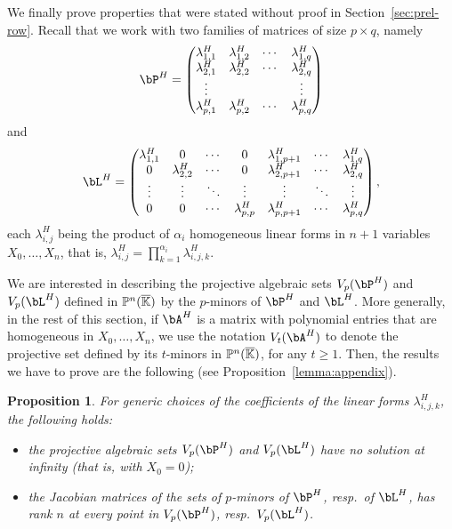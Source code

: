 \documentclass[12pt]{article}
\newtheorem*{propositionnonumber}{Proposition}
\begin{document}
We finally prove properties that were stated without proof in
Section~\ref{sec:prel-row}.  Recall that we work with two families of
matrices of size $p \times q$, namely
\begin{align}\label{eqdef:type2b}
\bP^H= \left( \begin{matrix}
\lambda^H_{1,1} & \lambda^H_{1,2} & \cdots & \lambda^H_{1, q}\\
 \lambda^H_{2,1} &  \lambda^H_{2,2} & \cdots & \lambda^H_{2, q}\\
 \vdots & & & \vdots\\
 \lambda^H_{p,1} &  \lambda^H_{p,2}& \cdots & \lambda^H_{p, q}
\end{matrix} \right)
\end{align}
and
\begin{align}\label{eqdef:type1b}
\bL^H= \left( \begin{matrix}
\lambda^H_{1,1} & 0 & \cdots & 0 & \lambda^H_{1,p+1} & \cdots & \lambda^H_{1, q}\\
0 & \lambda^H_{2,2} & \cdots & 0 & \lambda^H_{2,p+1} & \cdots & \lambda^H_{2, q}\\
\vdots & \vdots & \ddots & \vdots & \vdots & \ddots & \vdots\\
0 & 0 & \cdots & \lambda^H_{p,p} & \lambda^H_{p,p+1} & \cdots & \lambda^H_{p, q}
\end{matrix} \right),
\end{align}
each $\lambda^H_{i,j}$ being the product of $\alpha_i$ homogeneous
linear forms in $n+1$ variables $X_0,\dots,X_n$, that is,
$\lambda^H_{i,j}=\prod_{k=1}^{\alpha_i} \lambda^H_{i,j,k}$.

We are interested in describing the projective algebraic sets
$V_p(\bP^H)$ and $V_p(\bL^H)$ defined in $\mathbb{P}^n(\overline{\mathbb{K}})$ by the
$p$-minors of $\bP^H$ and $\bL^H$. More generally, in the rest of this
section, if $\bA^H$ is a matrix with polynomial entries that are
homogeneous in $X_0,\dots,X_n$, we use the notation $V_t(\bA^H)$ to
denote the projective set defined by its $t$-minors in $\mathbb{P}^n(\overline{\mathbb{K}})$,
for any $t\ge 1$. Then, the results we have to prove are the following
(see Proposition~\ref{lemma:appendix}).
\begin{propositionnonumber}\label{lemma:appendix2}
  For generic choices of the coefficients of the linear forms
  $\lambda^H_{i,j,k}$, the following holds:
  \begin{itemize}
  \item the projective algebraic sets $V_p(\bP^H)$ and $V_p(\bL^H)$
    have no solution at infinity (that is, with $X_0=0$);
  \item the Jacobian matrices of the sets of $p$-minors 
    of $\bP^H$, resp.\ of $\bL^H$, has rank $n$ at every point 
    in $V_p(\bP^H)$, resp.\ $V_p(\bL^H)$.
\end{itemize}
\end{propositionnonumber}
\end{document}
